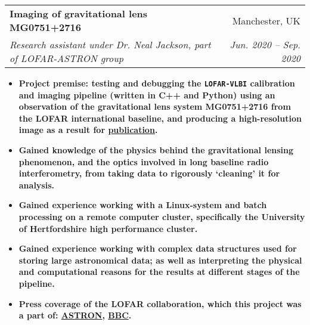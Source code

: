 \documentclass[letterpaper,11pt]{article}
\makeatletter
\newcommand{\resumeItem}[2]{
  \item\small{
    \textbf{#1}{ #2 \vspace{-2pt}}
  }
}
\newcommand{\resumeSubheading}[4]{
  \vspace{-1pt}\item
    \begin{tabular*}{0.97\textwidth}[t]{l@{\extracolsep{\fill}}r}
      \textbf{#1} & #2 \\
      \textit{\small#3} & \textit{\small #4} \\
    \end{tabular*}\vspace{-5pt}
}
\newcommand{\resumeItemListStart}{\begin{itemize}}
\newcommand{\resumeItemListEnd}{\end{itemize}\vspace{-5pt}}
\makeatother
\begin{document}
      \resumeSubheading
      {Imaging of gravitational lens MG0751+2716 }{Manchester, UK}
      {Research assistant under Dr. Neal Jackson, part of LOFAR-ASTRON group}{Jun. 2020 -- Sep. 2020}
      \resumeItemListStart
        \resumeItem
          {\normalfont \textbf{Project premise}: testing and debugging the \texttt{LOFAR-VLBI} calibration and imaging pipeline (written in C++ and Python) using an observation of the gravitational lens system MG0751+2716 from the LOFAR international baseline, and producing a high-resolution image as a result for \href{https://doi.org/10.1051/0004-6361/202141227}{publication}.}{}
        \resumeItem
          {\normalfont Gained knowledge of the physics behind the gravitational lensing phenomenon, and the optics involved in long baseline radio interferometry, from taking data to rigorously `cleaning' it for analysis.}{}
        \resumeItem
          {\normalfont         
          Gained experience working with a Linux-system and batch processing on a remote computer cluster, specifically the University of Hertfordshire high performance cluster.}{}
        \resumeItem
          {\normalfont Gained experience working with complex data structures used for storing large astronomical data; as well as interpreting the physical and computational reasons for the results at different stages of the pipeline.}{}
        \resumeItem
          {\normalfont Press coverage of the LOFAR collaboration, which this project was a part of: \href{https://www.astron.nl/most-detailed-ever-images-of-galaxies-revealed-using-lofar }{ASTRON}, \href{https://www.bbc.co.uk/news/science-environment-57998940}{BBC}.}{}

      \resumeItemListEnd
      
\begin{comment}
    \resumeSubheading
      {Simulating solutions to oil reservoir souring}{Manchester, UK}
      {Research intern, Summer Intern Programme 2019, British Petroleum}{Jul. 2019 - Sep. 2019}
      \resumeItemListStart
        \resumeItem
          {\normalfont \textbf{Project premise}: simulating sulphate reducing bacteria (SRBs), responsible for fouling crude oil in reservoirs, on the agent-based model code \texttt{iDynoMiCS} (written in Java) and testing different techniques to mitigate them.}{}
        \resumeItem
          {\normalfont Gained knowledge of the biophysics involved in modelling bacteria, specifically the simulation of bacterial biofilms in a solution using hard-sphere agent-based models.}{}
        \resumeItem
          {\normalfont Studied the effect of bio-competitive exclusion on growth of SRBs by introducing competing bacteria (NRBs), with realistic substrate composition and growth models, in the simulation.}{}
        \resumeItem
          {\normalfont Designed a method to implement surface topography in the simulation model, through stationary non-interacting spheres called `bricks', and studied the effects of surface roughness on substrate consumption and growth inhibition of SRBs.}{}
      \resumeItemListEnd
\end{comment}
\end{document}
